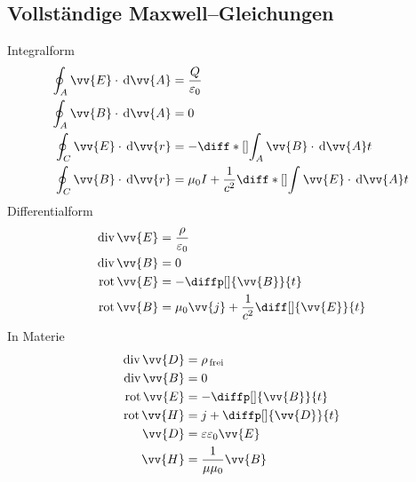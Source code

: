 \documentclass[a4paper,12pt]{article}
\newcommand{\td}{\,\text{d}}
\begin{document}
\subsection{Vollständige Maxwell--Gleichungen}
Integralform
\begin{align*} 
        \oint_{A}^{}\vv{E}\cdot \td \vv{A}&=\dfrac{Q}{\varepsilon _0}\\
        \oint_{A}^{}\vv{B}\cdot \td \vv{A}&=0\\
        \oint_{C}^{}\vv{E}\cdot \td \vv{r}&=-\diff*[]{\int_{A}^{}\vv{B}\cdot \td \vv{A}}{t}\\
        \oint_{C}^{}\vv{B}\cdot \td \vv{r}&=\mu _0I+\dfrac{1}{c^2}\diff*[]{\int_{}^{}\vv{E}\cdot \td \vv{A}}{t}
\end{align*} 
Differentialform
\begin{align*} 
        \,\text{div}\,\vv{E}&=\dfrac{\rho }{\varepsilon _0}\\
        \,\text{div}\,\vv{B}&=0\\
        \,\text{rot}\,\vv{E}&=-\diffp[]{\vv{B}}{t}\\
        \,\text{rot}\,\vv{B}&=\mu _0\vv{j}+\dfrac{1}{c^2}\diff[]{\vv{E}}{t}
\end{align*} 
In Materie
\begin{align*} 
        \,\text{div}\,\vv{D}&=\rho _{\,\text{frei}\,}\\
        \,\text{div}\,\vv{B}&=0\\
        \,\text{rot}\,\vv{E}&=-\diffp[]{\vv{B}}{t}\\
        \,\text{rot}\,\vv{H}&=j+\diffp[]{\vv{D}}{t}\\
        \vv{D}&=\varepsilon \varepsilon _0\vv{E}\\
        \vv{H}&=\dfrac{1}{\mu \mu _0}\vv{B}
\end{align*} 
\end{document}

